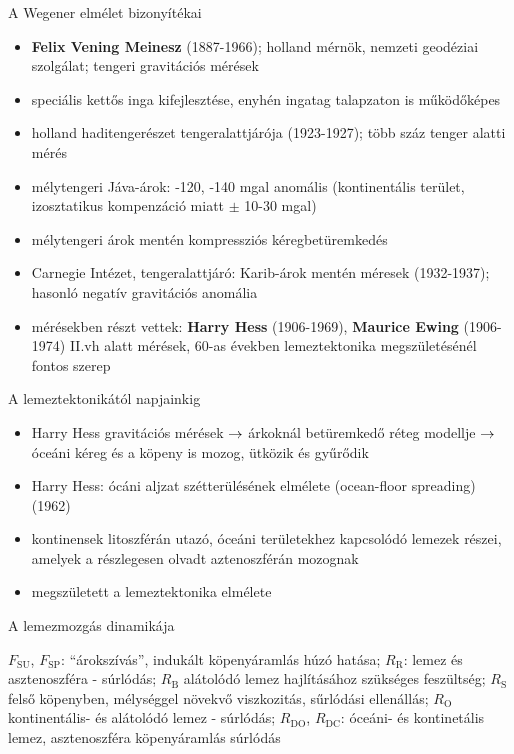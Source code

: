 \documentclass{beamer}
\begin{document}
\begin{frame}{A Wegener elmélet bizonyítékai}
    \begin{itemize}
        \item \textbf{Felix Vening Meinesz} (1887-1966); holland mérnök, nemzeti geodéziai szolgálat; tengeri gravitációs mérések
        \item speciális kettős inga kifejlesztése, enyhén ingatag talapzaton is működőképes
        \item holland haditengerészet tengeralattjárója (1923-1927); több száz tenger alatti mérés
        \item mélytengeri Jáva-árok: -120, -140 mgal anomális (kontinentális terület, izosztatikus kompenzáció miatt $\pm$ 10-30 mgal)
        \item mélytengeri árok mentén kompressziós kéregbetüremkedés
        \item Carnegie Intézet, tengeralattjáró: Karib-árok mentén méresek (1932-1937); hasonló negatív gravitációs anomália
        \item mérésekben részt vettek: \textbf{Harry Hess} (1906-1969), \textbf{Maurice Ewing} (1906-1974) II.vh alatt mérések, 60-as években lemeztektonika megszületésénél fontos szerep
    \end{itemize}
\end{frame}


\begin{frame}{A lemeztektonikától napjainkig}
    \begin{itemize}
        \item Harry Hess gravitációs mérések $\rightarrow$ árkoknál betüremkedő réteg modellje $\rightarrow$ óceáni kéreg és a köpeny is mozog, ütközik és gyűrődik
        \item Harry Hess: ócáni aljzat szétterülésének elmélete (ocean-floor spreading) (1962)
        \item kontinensek litoszférán utazó, óceáni területekhez kapcsolódó lemezek részei, amelyek a részlegesen olvadt aztenoszférán mozognak
        \item megszületett a lemeztektonika elmélete
    \end{itemize}
\end{frame}


\begin{frame}{A lemezmozgás dinamikája}
    \begin{minic}{0.7}
        \centering
    \end{minic}
    $F_{\text{SU}}$, $F_{\text{SP}}$: ``árokszívás'', indukált köpenyáramlás húzó hatása; $R_{\text{R}}$: lemez és asztenoszféra - súrlódás; $R_{\text{B}}$ alátolódó lemez hajlításához szükséges feszültség; $R_{\text{S}}$ felső köpenyben, mélységgel növekvő viszkozitás, sűrlódási ellenállás; $R_{\text{O}}$ kontinentális- és alátolódó lemez - súrlódás; $R_{\text{DO}}$, $R_{\text{DC}}$: óceáni- és kontinetális lemez, asztenoszféra köpenyáramlás súrlódás
\end{frame}
\end{document}
